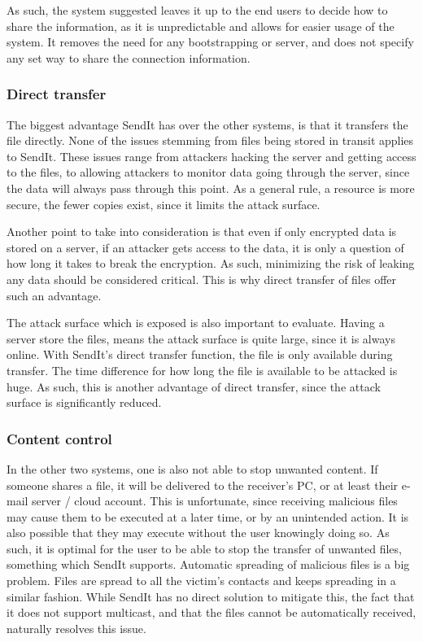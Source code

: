 \documentclass[letterpaper, 10 pt, conference]{ieeeconf}  %
\begin{document}
    As such, the system suggested leaves it up to the end users to decide how to share the information, as it is unpredictable and allows for easier usage of the system. It removes the need for any bootstrapping or server, and does not specify any set way to share the connection information.

    \subsubsection{Direct transfer}
    The biggest advantage SendIt has over the other systems, is that it transfers the file directly. None of the issues stemming from files being stored in transit applies to SendIt. These issues range from attackers hacking the server and getting access to the files, to allowing attackers to monitor data going through the server, since the data will always pass through this point. As a general rule, a resource is more secure, the fewer copies exist, since it limits the attack surface.

    Another point to take into consideration is that even if only encrypted data is stored on a server, if an attacker gets access to the data, it is only a question of how long it takes to break the encryption. As such, minimizing the risk of leaking any data should be considered critical. This is why direct transfer of files offer such an advantage.

    The attack surface which is exposed is also important to evaluate. Having a server store the files, means the attack surface is quite large, since it is always online. With SendIt's direct transfer function, the file is only available during transfer. The time difference for how long the file is available to be attacked is huge. As such, this is another advantage of direct transfer, since the attack surface is significantly reduced.

    \subsubsection{Content control}
    In the other two systems, one is also not able to stop unwanted content. If someone shares a file, it will be delivered to the receiver's PC, or at least their e-mail server / cloud account. This is unfortunate, since receiving malicious files may cause them to be executed at a later time, or by an unintended action. It is also possible that they may execute without the user knowingly doing so. As such, it is optimal for the user to be able to stop the transfer of unwanted files, something which SendIt supports.
    Automatic spreading of malicious files is a big problem. Files are spread to all the victim's contacts and keeps spreading in a similar fashion. While SendIt has no direct solution to mitigate this, the fact that it does not support multicast, and that the files cannot be automatically received, naturally resolves this issue.
\end{document}
